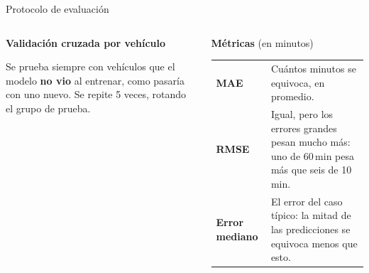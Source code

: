 \documentclass[aspectratio=169,10pt]{beamer}
\begin{document}
\begin{frame}{Protocolo de evaluación}
\begin{columns}[T,onlytextwidth]
\begin{column}{0.5\textwidth}
  \textbf{Validación cruzada por vehículo}\par\vspace{3pt}
  {\small Se prueba siempre con vehículos que el modelo \textbf{no vio} al entrenar, como pasaría con uno nuevo. Se repite 5 veces, rotando el grupo de prueba.}\par
  \vspace{0.3cm}
  \centering
\end{column}
\begin{column}{0.46\textwidth}
  \textbf{Métricas} {\small(en minutos)}\par\vspace{6pt}
  \begingroup\small
  \renewcommand{\arraystretch}{1.5}
  \begin{tabularx}{\linewidth}{@{}L{2.2cm}Y@{}}
    \toprule
    \textbf{MAE} & Cuántos minutos se equivoca, en promedio. \\
    \textbf{RMSE} & Igual, pero los errores grandes pesan mucho más: uno de 60\,min pesa más que seis de 10\,min. \\
    \textbf{Error mediano} & El error del caso típico: la mitad de las predicciones se equivoca menos que esto. \\
    \bottomrule
  \end{tabularx}\endgroup
\end{column}
\end{columns}
\end{frame}
\end{document}
